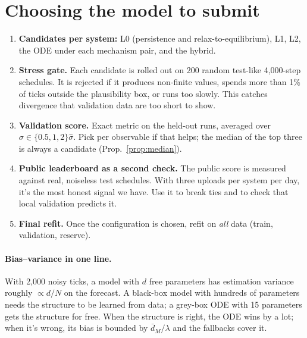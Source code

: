 \documentclass[11pt]{article}
\theoremstyle{plain}
\theoremstyle{definition}
\theoremstyle{remark}
\begin{document}
\section{Choosing the model to submit}\label{sec:selection}

\begin{enumerate}
\item \textbf{Candidates per system:} L0 (persistence and relax-to-equilibrium), L1, L2, the ODE under each mechanism pair, and the hybrid.
\item \textbf{Stress gate.} Each candidate is rolled out on 200 random test-like 4,000-step schedules. It is rejected if it produces non-finite values, spends more than 1\% of ticks outside the plausibility box, or runs too slowly. This catches divergence that validation data are too short to show.
\item \textbf{Validation score.} Exact metric on the held-out runs, averaged over $\sigma\in\{0.5,1,2\}\hat\sigma$. Pick per observable if that helps; the median of the top three is always a candidate (Prop.~\ref{prop:median}).
\item \textbf{Public leaderboard as a second check.} The public score is measured against real, noiseless test schedules. With three uploads per system per day, it's the most honest signal we have. Use it to break ties and to check that local validation predicts it.
\item \textbf{Final refit.} Once the configuration is chosen, refit on \emph{all} data (train, validation, reserve).
\end{enumerate}

\paragraph{Bias--variance in one line.} With 2,000 noisy ticks, a model with $d$ free parameters has estimation variance roughly $\propto d/N$ on the forecast. A black-box model with hundreds of parameters needs the structure to be learned from data; a grey-box ODE with 15 parameters gets the structure for free. When the structure is right, the ODE wins by a lot; when it's wrong, its bias is bounded by $\bar d_M/\lambda$ and the fallbacks cover it.

\end{document}
